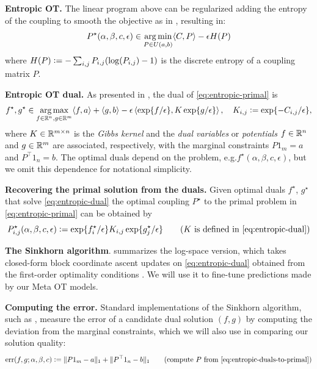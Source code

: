\documentclass{article}
\newcommand{\eg}{e.g.\xspace}
\newcommand{\defeq}{\vcentcolon=}
\begin{document}
\textbf{Entropic OT.}
The linear program above can be regularized adding the entropy
of the coupling to smooth the objective as in
\citet{cominetti1994asymptotic,cuturi2013sinkhorn},
resulting in:
\begin{equation}
  P^\star(\alpha,\beta,c,\epsilon)\in \operatorname*{arg\,min}_{P\in U(a,b)} \langle C, P \rangle - \epsilon H(P)
  \label{eq:entropic-primal}
\end{equation}
where $H(P)\defeq -\sum_{i,j} P_{i,j}(\log(P_{i,j})-1)$
is the discrete entropy of a coupling matrix $P$.

\textbf{Entropic OT dual.}
As presented in \citet[Prop.~4.4]{peyre2019computational},
the dual of \cref{eq:entropic-primal} is
\begin{equation}
  f^\star,g^\star\in\argmax_{f\in\R^n,g\in\R^m} \langle f, a\rangle + \langle g, b \rangle
    - \epsilon\left\langle \exp\{f/\epsilon\}, K\exp\{g/\epsilon\}\right\rangle,
  \quad
  K_{i,j}\defeq \exp\{-C_{i,j}/\epsilon\},
  \label{eq:entropic-dual}
\end{equation}
where $K\in\mathbb{R}^{m\times n}$ is the \emph{Gibbs kernel}
and the \emph{dual variables} or \emph{potentials}
$f\in\mathbb{R}^n$ and $g\in\mathbb{R}^m$ are associated, respectively, with the
marginal constraints $P1_m=a$ and $P^\top 1_n=b$.
The optimal duals depend on the problem,
\eg $f^\star(\alpha, \beta, c, \epsilon)$, but we
omit this dependence for notational simplicity.

\textbf{Recovering the primal solution from the duals.}
Given optimal duals $f^\star$, $g^\star$ that solve
\cref{eq:entropic-dual} the optimal coupling
$P^\star$ to the primal problem in \cref{eq:entropic-primal}
can be obtained by
\begin{equation}
  P_{i,j}^\star(\alpha, \beta, c, \epsilon)\defeq \exp\{f_i^\star/\epsilon\}K_{i,j}\exp\{g_j^\star/\epsilon\}
  \qquad
  (K\ {\rm is\ defined\ in\ \cref{eq:entropic-dual}})
  \label{eq:entropic-duals-to-primal}
\end{equation}

\textbf{The Sinkhorn algorithm}.
 summarizes the log-space version,
which takes closed-form block coordinate ascent updates
on \cref{eq:entropic-dual}
obtained from the first-order optimality conditions
\citep[Remark~4.21]{peyre2019computational}.
We will use it to fine-tune predictions made
by our Meta OT models.

\textbf{Computing the error.}
Standard implementations of the Sinkhorn algorithm,
such as \citet{flamary2021pot,cuturi2022optimal},
measure the error of a candidate dual solution $(f,g)$ by
computing the deviation from the marginal constraints,
which we will also use in comparing our solution quality:
\begin{equation}
  {\rm err}(f,g; \alpha, \beta, c)\defeq\|P1_m-a\|_1 + \|P^\top1_n-b\|_1
  \qquad
  {\rm (compute}\ P\ {\rm from\ \cref{eq:entropic-duals-to-primal})}
  \label{eq:sinkhorn-err}
\end{equation}
\end{document}
